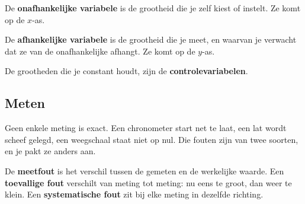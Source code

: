\begin{theorie}
De \textbf{\textcolor{accent}{onafhankelijke variabele}} is de grootheid die je zelf kiest of instelt. Ze komt op de $x$-as.

\vspace{1mm}
De \textbf{\textcolor{accent}{afhankelijke variabele}} is de grootheid die je meet, en waarvan je verwacht dat ze van de onafhankelijke afhangt. Ze komt op de $y$-as.

\vspace{1mm}
De grootheden die je constant houdt, zijn de \textbf{\textcolor{accent}{controlevariabelen}}.
\end{theorie}


\begin{oefeningen}
\end{oefeningen}

\subsection{Meten}

Geen enkele meting is exact. Een chronometer start net te laat, een lat wordt scheef gelegd, een weegschaal staat niet op nul. Die fouten zijn van twee soorten, en je pakt ze anders aan.

\begin{theorie}
De \textbf{\textcolor{accent}{meetfout}} is het verschil tussen de gemeten en de werkelijke waarde. Een \textbf{\textcolor{accent}{toevallige fout}} verschilt van meting tot meting: nu eens te groot, dan weer te klein. Een \textbf{\textcolor{accent}{systematische fout}} zit bij elke meting in dezelfde richting.
\end{theorie}

